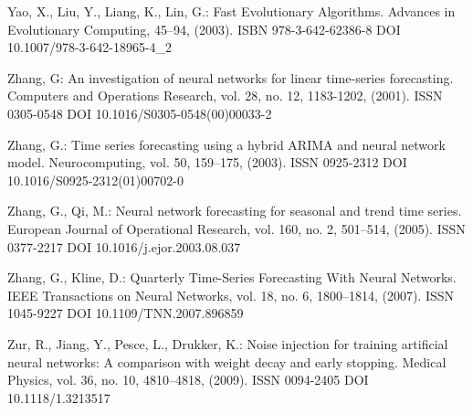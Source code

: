 \begin{thebibliography}{99.}
 Yao, X., Liu, Y., Liang, K., Lin, G.: Fast Evolutionary Algorithms. Advances in Evolutionary Computing, 45--94, (2003). ISBN 978-3-642-62386-8 DOI 10.1007/978-3-642-18965-4\_2

 Zhang, G: An investigation of neural networks for linear time-series forecasting. Computers and Operations Research, vol. 28, no. 12, 1183-1202, (2001). ISSN 0305-0548 DOI 10.1016/S0305-0548(00)00033-2

 Zhang, G.: Time series forecasting using a hybrid ARIMA and neural network model. Neurocomputing, vol. 50, 159--175, (2003). ISSN 0925-2312 DOI 10.1016/S0925-2312(01)00702-0

 Zhang, G., Qi, M.: Neural network forecasting for seasonal and trend time series. European Journal of Operational Research, vol. 160, no. 2, 501--514, (2005). ISSN 0377-2217 DOI 10.1016/j.ejor.2003.08.037

 Zhang, G., Kline, D.: Quarterly Time-Series Forecasting With Neural Networks. IEEE Transactions on Neural Networks, vol. 18, no. 6, 1800--1814, (2007). ISSN 1045-9227 DOI 10.1109/TNN.2007.896859

 Zur, R., Jiang, Y., Pesce, L., Drukker, K.: Noise injection for training artificial neural networks: A comparison with weight decay and early stopping. Medical Physics, vol. 36, no. 10, 4810--4818, (2009). ISSN 0094-2405 DOI 10.1118/1.3213517

\end{thebibliography}
